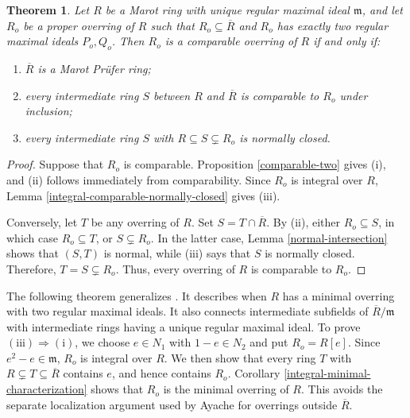 \documentclass[12pt]{article}
\newtheorem{theorem}{Theorem}
\begin{document}
	\begin{theorem}\label{comparable-two-characterization}
		Let $R$ be a Marot ring with unique regular maximal ideal $\mathfrak{m}$, and let $R_o$ be a proper overring of $R$ such that $R_o\subseteq\overline R$ and $R_o$ has exactly two regular maximal ideals $P_o,Q_o$. Then $R_o$ is a comparable overring of $R$ if and only if:
		\begin{enumerate}[label=(\roman*)]
			\item $\overline R$ is a Marot Prüfer ring;
			\item every intermediate ring $S$ between $R$ and $\overline R$ is comparable to $R_o$ under inclusion;
			\item every intermediate ring $S$ with $R\subseteq S\subsetneq R_o$ is normally closed.
		\end{enumerate}
	\end{theorem}
	\begin{proof}
		Suppose that $R_o$ is comparable. Proposition \ref{comparable-two} gives (i), and (ii) follows immediately from comparability. Since $R_o$ is integral over $R$, Lemma \ref{integral-comparable-normally-closed} gives (iii).
		
		Conversely, let $T$ be any overring of $R$. Set $S=T\cap\overline R$. By (ii), either $R_o\subseteq S$, in which case $R_o\subseteq T$, or $S\subsetneq R_o$. In the latter case, Lemma \ref{normal-intersection} shows that $(S,T)$ is normal, while (iii) says that $S$ is normally closed. Therefore, $T=S\subsetneq R_o$. Thus, every overring of $R$ is comparable to $R_o$.
	\end{proof}
	The following theorem generalizes \cite[Theorem 25]{ayache}. It describes when $R$ has a minimal overring with two regular maximal ideals. It also connects intermediate subfields of $\overline R/\mathfrak m$ with intermediate rings having a unique regular maximal ideal. To prove $(\mathrm{iii})\Rightarrow(\mathrm{i})$, we choose $e\in N_1$ with $1-e\in N_2$ and put $R_o=R[e]$. Since $e^2-e\in\mathfrak m$, $R_o$ is integral over $R$. We then show that every ring $T$ with $R\subsetneq T\subseteq\overline R$ contains $e$, and hence contains $R_o$. Corollary \ref{integral-minimal-characterization} shows that $R_o$ is the minimal overring of $R$. This avoids the separate localization argument used by Ayache for overrings outside $\overline R$.
\end{document}
